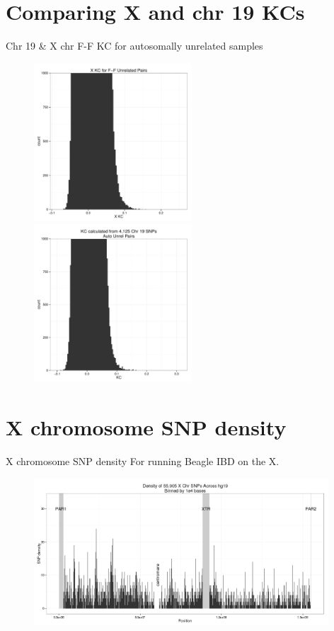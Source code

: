 \documentclass{beamer}
\begin{document}
\section[]{Comparing X and chr 19 KCs}
\begin{frame}{Chr 19 \& X chr F-F KC for autosomally unrelated samples}
\begin{figure}
\includegraphics[height=5.9cm]{xkc_unrel_hist_FFpairs_trunc.pdf}
\includegraphics[height=5.9cm]{kc_chr19_autounrel_hist_trunc.pdf}
\end{figure}
\end{frame}

\section[]{X chromosome SNP density}
\begin{frame}{X chromosome SNP density}
For running Beagle IBD on the X.
\begin{figure}
\includegraphics[width=11cm]{chrX_density.png}
\end{figure}
\end{frame}
\end{document}
